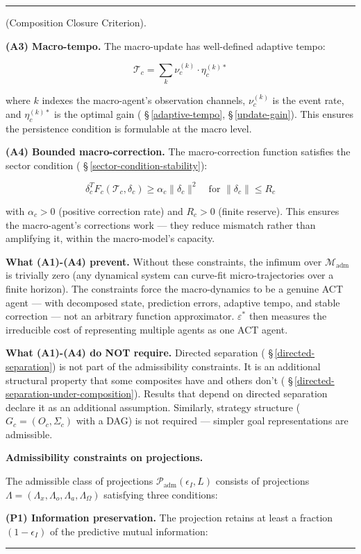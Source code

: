 \documentclass[11pt,oneside]{article}
\newcounter{claim}[section]
\renewcommand{\theclaim}{\thesection.\arabic{claim}}
\newenvironment{segment}[2]{%
  \refstepcounter{claim}%
  \bigskip\noindent\hrule\smallskip
  \noindent{\bfseries #1~\theclaim}\enskip(#2).\par\smallskip
  \noindent\ignorespaces
}{%
  \par\smallskip\noindent\hrule\bigskip
}
\newenvironment{formulation}[1][]{\begin{segment}{Formulation}{#1}}{\end{segment}}
\begin{document}
\begin{formulation}[Composition Closure Criterion]
\textbf{(A3) Macro-tempo.} The macro-update has well-defined adaptive tempo:

$$\mathcal T_c = \sum_k \nu_c^{(k)} \cdot \eta_c^{(k)*}$$

where $k$ indexes the macro-agent's observation channels, $\nu_c^{(k)}$ is the event rate, and $\eta_c^{(k)*}$ is the optimal gain ( \S\,\ref{adaptive-tempo}, \S\,\ref{update-gain}). This ensures the persistence condition is formulable at the macro level.

\textbf{(A4) Bounded macro-correction.} The macro-correction function satisfies the sector condition ( \S\,\ref{sector-condition-stability}):

$$\delta_c^T F_c(\mathcal T_c, \delta_c) \geq \alpha_c \lVert \delta_c \rVert^2 \quad \text{for } \lVert \delta_c \rVert \leq R_c$$

with $\alpha_c > 0$ (positive correction rate) and $R_c > 0$ (finite reserve). This ensures the macro-agent's corrections work — they reduce mismatch rather than amplifying it, within the macro-model's capacity.

\textbf{What (A1)-(A4) prevent.} Without these constraints, the infimum over $\mathcal M_{\text{adm}}$ is trivially zero (any dynamical system can curve-fit micro-trajectories over a finite horizon). The constraints force the macro-dynamics to be a genuine ACT agent — with decomposed state, prediction errors, adaptive tempo, and stable correction — not an arbitrary function approximator. $\varepsilon^*$ then measures the irreducible cost of representing multiple agents as one ACT agent.

\textbf{What (A1)-(A4) do NOT require.} Directed separation ( \S\,\ref{directed-separation}) is not part of the admissibility constraints. It is an additional structural property that some composites have and others don't ( \S\,\ref{directed-separation-under-composition}). Results that depend on directed separation declare it as an additional assumption. Similarly, strategy structure ($G_c = (O_c, \Sigma_c)$ with a DAG) is not required — simpler goal representations are admissible.


\medskip\noindent\textbf{Admissibility constraints on projections.}



The admissible class of projections $\mathcal P_{\text{adm}}(\epsilon_I, L)$ consists of projections $\Lambda = (\Lambda_x, \Lambda_o, \Lambda_a, \Lambda_\Omega)$ satisfying three conditions:

\textbf{(P1) Information preservation.} The projection retains at least a fraction $(1 - \epsilon_I)$ of the predictive mutual information:


\end{formulation}
\end{document}
